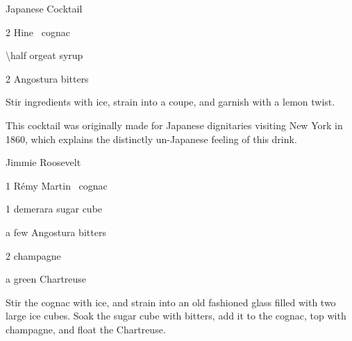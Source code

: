 \begin{Cocktail}[\PDT*]{Japanese Cocktail}
  \begin{Ingredients}
  \item \SI{2}{\oz} Hine \vsop\ cognac
  \item \SI{\half}{\oz} orgeat syrup
  \item 2 \si{\dashes} Angostura bitters
  \end{Ingredients}
  
  \begin{Instructions}
	Stir ingredients with ice, strain into a coupe, and garnish with a lemon twist.
	
	This cocktail was originally made for Japanese dignitaries visiting New York in 1860, which explains the distinctly un-Japanese feeling of this drink.
  \end{Instructions}
\end{Cocktail}

\begin{Cocktail}[\PDT*]{Jimmie Roosevelt}
  \begin{Ingredients}
  \item \SI{1}{\oz} R\'emy Martin \vsop\ cognac
  \item 1 demerara sugar cube
  \item a few \si{\dashes} Angostura bitters
  \item \SI{2}{\oz} champagne
  \item a \si{\dash} green Chartreuse
  \end{Ingredients}
  
  \begin{Instructions}
	Stir the cognac with ice, and strain into an old fashioned glass filled with two large ice cubes.  Soak the sugar cube with bitters, add it to the cognac, top with champagne, and float the Chartreuse.
  \end{Instructions}
\end{Cocktail}

